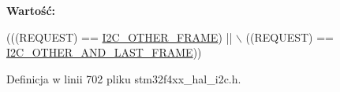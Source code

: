 {\bfseries Wartość\+:}
\begin{DoxyCode}
(((REQUEST) == \hyperlink{group___i2_c___xfer_options__definition_gabedde3791be7cb544ffeb9e408d1980e}{I2C\_OTHER\_FRAME})     || \(\backslash\)
                                                        ((REQUEST) == 
      \hyperlink{group___i2_c___xfer_options__definition_ga272995b7f02a1e44b589cc9794093d0b}{I2C\_OTHER\_AND\_LAST\_FRAME}))
\end{DoxyCode}


Definicja w linii 702 pliku stm32f4xx\+\_\+hal\+\_\+i2c.\+h.

